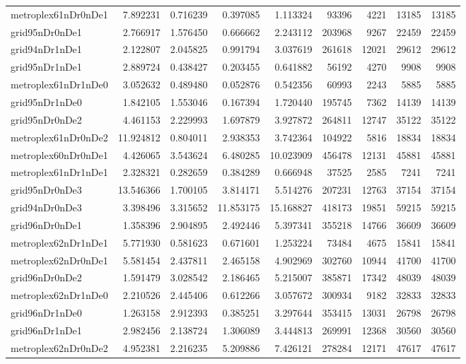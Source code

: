 \documentclass[../../../thesis.tex]{subfiles}
\begin{document}
\begin{longtable}{|l|r|r|r|r|r|r|r|r|}
metroplex61nDr0nDe1 & 7.892231 & 0.716239 & 0.397085 & 1.113324 & 93396 & 4221 & 13185 & 13185 \\
grid95nDr0nDe1 & 2.766917 & 1.576450 & 0.666662 & 2.243112 & 203968 & 9267 & 22459 & 22459 \\
grid94nDr1nDe1 & 2.122807 & 2.045825 & 0.991794 & 3.037619 & 261618 & 12021 & 29612 & 29612 \\
grid95nDr1nDe1 & 2.889724 & 0.438427 & 0.203455 & 0.641882 & 56192 & 4270 & 9908 & 9908 \\
metroplex61nDr1nDe0 & 3.052632 & 0.489480 & 0.052876 & 0.542356 & 60993 & 2243 & 5885 & 5885 \\
grid95nDr1nDe0 & 1.842105 & 1.553046 & 0.167394 & 1.720440 & 195745 & 7362 & 14139 & 14139 \\
grid95nDr0nDe2 & 4.461153 & 2.229993 & 1.697879 & 3.927872 & 264811 & 12747 & 35122 & 35122 \\
metroplex61nDr0nDe2 & 11.924812 & 0.804011 & 2.938353 & 3.742364 & 104922 & 5816 & 18834 & 18834 \\
metroplex60nDr0nDe1 & 4.426065 & 3.543624 & 6.480285 & 10.023909 & 456478 & 12131 & 45881 & 45881 \\
metroplex61nDr1nDe1 & 2.328321 & 0.282659 & 0.384289 & 0.666948 & 37525 & 2585 & 7241 & 7241 \\
grid95nDr0nDe3 & 13.546366 & 1.700105 & 3.814171 & 5.514276 & 207231 & 12763 & 37154 & 37154 \\
grid94nDr0nDe3 & 3.398496 & 3.315652 & 11.853175 & 15.168827 & 418173 & 19851 & 59215 & 59215 \\
grid96nDr0nDe1 & 1.358396 & 2.904895 & 2.492446 & 5.397341 & 355218 & 14766 & 36609 & 36609 \\
metroplex62nDr1nDe1 & 5.771930 & 0.581623 & 0.671601 & 1.253224 & 73484 & 4675 & 15841 & 15841 \\
metroplex62nDr0nDe1 & 5.581454 & 2.437811 & 2.465158 & 4.902969 & 302760 & 10944 & 41700 & 41700 \\
grid96nDr0nDe2 & 1.591479 & 3.028542 & 2.186465 & 5.215007 & 385871 & 17342 & 48039 & 48039 \\
metroplex62nDr1nDe0 & 2.210526 & 2.445406 & 0.612266 & 3.057672 & 300934 & 9182 & 32833 & 32833 \\
grid96nDr1nDe0 & 1.263158 & 2.912393 & 0.385251 & 3.297644 & 353415 & 13031 & 26798 & 26798 \\
grid96nDr1nDe1 & 2.982456 & 2.138724 & 1.306089 & 3.444813 & 269991 & 12368 & 30560 & 30560 \\
metroplex62nDr0nDe2 & 4.952381 & 2.216235 & 5.209886 & 7.426121 & 278284 & 12171 & 47617 & 47617 \\

\end{longtable}
\end{document}
